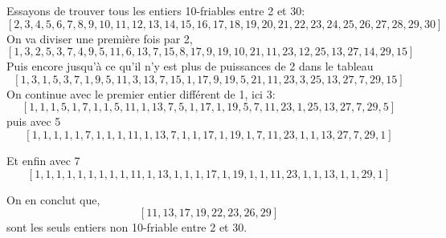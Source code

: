 \begin{example}
Essayons de trouver tous les entiers 10-friables entre 2 et 30: 
\[[2, 3, 4, 5, 6, 7, 8, 9, 10, 11, 12, 13, 14, 15, 16, 17, 18, 19, 20, 21, 22, 23, 24, 25, 26, 27, 28, 29, 30]\]
On va diviser une première fois par 2,
\[[1, 3, 2, 5, 3, 7, 4, 9, 5, 11, 6, 13, 7, 15, 8, 17, 9, 19, 10, 21, 11, 23, 12, 25, 13, 27, 14, 29, 15]\]
Puis encore jusqu'à ce qu'il n'y est plus de puissances de 2 dans le tableau
\[[1, 3, 1, 5, 3, 7, 1, 9, 5, 11, 3, 13, 7, 15, 1, 17, 9, 19, 5, 21, 11, 23, 3, 25, 13, 27, 7, 29, 15]\]
On continue avec le premier entier différent de 1, ici 3:
\[[1, 1, 1, 5, 1, 7, 1, 1, 5, 11, 1, 13, 7, 5, 1, 17, 1, 19, 5, 7, 11, 23, 1, 25, 13, 27, 7, 29, 5]\]
puis avec 5
\[[1, 1, 1, 1, 1, 7, 1, 1, 1, 11, 1, 13, 7, 1, 1, 17, 1, 19, 1, 7, 11, 23, 1, 1, 13, 27, 7, 29, 1]\]

Et enfin avec 7
\[[1, 1, 1, 1, 1, 1, 1, 1, 1, 11, 1, 13, 1, 1, 1, 17, 1, 19, 1, 1, 11, 23, 1, 1, 13, 1, 1, 29, 1]\]

On en conclut que,
\[[11, 13, 17, 19, 22, 23, 26, 29]\]
sont les seuls entiers non 10-friable entre 2 et 30.
\end{example}